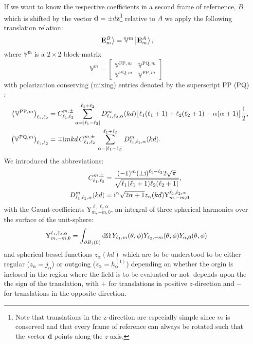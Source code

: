 If we want to know the respective coefficients in a second frame of refernence, $B$ which is shifted by the vector $\mathbf{d}=\pm d \mathbf{z}$\footnote{Note that translations in the z-direction are especially simple since $m$ is conserved and that every frame of reference can always be rotated such that the vector $\mathbf{d}$ points along the $z$-axis.} relative to $A$ we apply the following translation relation:
\begin{equation}
\ket{\mathbf{E}_m^B} = \mathbb{V}^\text{m} \ket{\mathbf{E}_m^A},
\end{equation}
where $\mathbb{V}^\text{m}$ is a $2\times 2$ block-matrix
\begin{equation}
\mathbb{V}^m = \left[
\begin{matrix}
\mathbb{V}^{\mathrm{PP},m} & \mathbb{V}^{\mathrm{PQ},m} \\
\mathbb{V}^{\mathrm{PQ},m} & \mathbb{V}^{\mathrm{PP},m}
\end{matrix}
\right]
\end{equation}
with polarization conserving (mixing) entries denoted by the superscript PP (PQ) \Cite{Wittmann1988}:
\begin{align}
&&\left(\mathbb{V}^{\mathrm{PP},m}\right)_{\ell_1,\ell_2} &= 
C^{m,\pm}_{\ell_1,\ell_2} \sum_{\alpha=|\ell_1-\ell_2|}^{\ell_1+\ell_2}
D^m_{\ell_1,\ell_2,\alpha}(kd) 
\big[\ell_1(\ell_1+1) + \ell_2(\ell_2+1)-\alpha(\alpha+1)\big]\frac{1}{2},\\
&&\left(\mathbb{V}^{\mathrm{PQ},m}\right)_{\ell_1,\ell_2} &= \mp \mathrm{i} m kd\,
C^{m,\pm}_{\ell_1,\ell_2} \,  \sum_{\alpha=|\ell_1-\ell_2|}^{\ell_1+\ell_2}
D^m_{\ell_1,\ell_2,\alpha}(kd).
\end{align}
We introduced the abbreviations:
\begin{align}
&&C^{m,\pm}_{\ell_1,\ell_2} &= \frac{(-1)^m (\pm \mathrm{i})^{\ell_1-\ell_2}2\sqrt{\pi}}
{\sqrt{\ell_1(\ell_1+1)\ell_2(\ell_2+1)}},\label{eqn:Ccoeff}
\\
&&D^m_{\ell_1,\ell_2,\alpha}(kd) &= \mathrm{i}^\alpha \sqrt{2\alpha+1} z_\alpha(kd)
\mathrm{Y}^{\ell_1, \ell_2, \alpha}_{m,-m,0}\label{eqn:Dcoeff}
\end{align}
with the Gaunt-coefficients $\mathrm{Y}^{\ell_1 \ell_2 \alpha}_{m,-m,0}$, an integral of three spherical harmonics over the surface of the unit-sphere:
\begin{equation}
\mathrm{Y}^{\ell_1, \ell_2, \alpha}_{m,-m,0} = \int_{\partial B_1(0)} \mathrm{d} \Omega \,
Y_{\ell_1,m}(\theta,\phi) Y_{\ell_2,-m}(\theta,\phi) Y_{\alpha,0} (\theta,\phi)
\label{eqn:Gaunt}
\end{equation}
and spherical bessel functions $z_\alpha(kd)$ which are to be understood to be either regular ($z_\alpha = j_\alpha$) or outgoing ($z_\alpha = h^{(1)}_\alpha$) depending on whether the orgin is inclosed in the region where the field is to be evaluated or not.    depends upon the the sign of the translation, with $+$ for translations in positive $z$-direction and $-$ for translations in the opposite direction.

